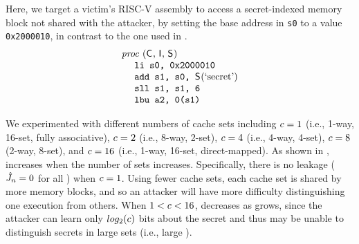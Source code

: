 Here, we target a victim's RISC-V assembly \proc to access a
secret-indexed memory block not shared with the attacker, by setting
the base address in \texttt{s0} to a value \texttt{0x2000010}, in
contrast to the one used in \accessProc.
\begin{align}
\begin{minipage}{0.6\columnwidth}
\begin{tabbing}
\proc(\ACIFn{}, \AIIFn{}, \SecFn{}) \\
** \= ** \= \kill
\> \texttt{li s0, 0x2000010}\\ 
\> \texttt{add s1, s0, $\SecFn{}(\secretVar)$} \\
\> \texttt{sll s1, s1, 6}\\
\> \texttt{lbu a2, 0(s1)}
\end{tabbing}
\end{minipage}
\label{eqn:proc}
\end{align}

We experimented with different numbers of cache sets \cachesetNmbr
including $c=1$ (i.e., 1-way, 16-set, fully associative),
$c=2$ (i.e., 8-way, 2-set), $c=4$ (i.e., 4-way,
4-set), $c=8$ (2-way, 8-set), and $c=16$ (i.e.,
1-way, 16-set, direct-mapped). As shown in
,
\JaccardRand{\secretsSetSize} increases when the number of sets
increases.  Specifically, there is no leakage
($\hat{J}_{n} = 0$ for all \secretsSetSize) when
$c=1$. Using fewer cache sets, each cache set is shared by
more memory blocks, and so an attacker will have more difficulty
distinguishing one execution from others. When $1 < c <
16$, \JaccardRand{\secretsSetSize} decreases as \secretsSetSize grows,
since the attacker can learn only $log_2(c)$ bits about the
secret and thus may be unable to distinguish secrets in large sets
(i.e., large \secretsSetSize).

